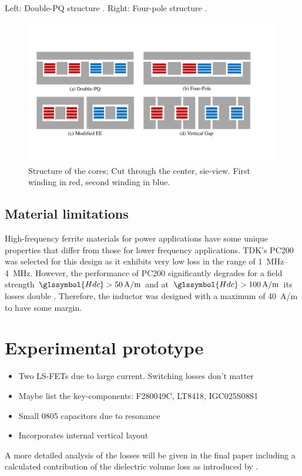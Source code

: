 \documentclass{IPEC2026}
\newcommand{\sbl}[1]{\glssymbol{#1}}
\begin{document}
Left: Double-PQ structure \cite{wangPCBWindingBasedCoupled2023}. Right: Four-pole structure \cite{huaUltrathinCoupledInductor2021}.

\begin{figure}
  \includegraphics[page=1, trim = 0cm 3cm 3cm 3cm, clip, width=\columnwidth]{figures/IPEC_Figures_PowerPoint.pdf}
  \caption{Structure of the cores; Cut through the center, sie-view. First winding in red, second winding in blue.}
  \label{fig:Core_Drawings}
\end{figure}


\subsection{Material limitations}
High-frequency ferrite materials for power applications have some unique properties that differ from those for lower frequency applications. TDK's PC200 was selected for this design as it exhibits very low loss in the range of \qtyrange{1}{4}{\MHz}. However, the performance of PC200 significantly degrades for a field strength $\sbl{Hdc} > \qty{50}{A/m}$ and at $\sbl{Hdc} > \qty{100}{A/m}$ its losses double \cite{tdkHighFrequencyLowLossFerrite}. Therefore, the inductor was designed with a maximum \sbl{Hdc} of \qty{40}{A/m} to have some margin.


\section{Experimental prototype}
\begin{itemize}
    \item Two LS-FETs due to large current. Switching losses don't matter
    \item Maybe list the key-components: F280049C, LT8418, IGC025S08S1
    \item Small 0805 capacitors due to resonance
    \item Incorporates internal vertical layout
\end{itemize}


A more detailed analysis of the losses will be given in the final paper including a calculated contribution of the dielectric volume loss as introduced by \cite{baumannInvestigationCorelossMechanisms2022}. 



\end{document}
